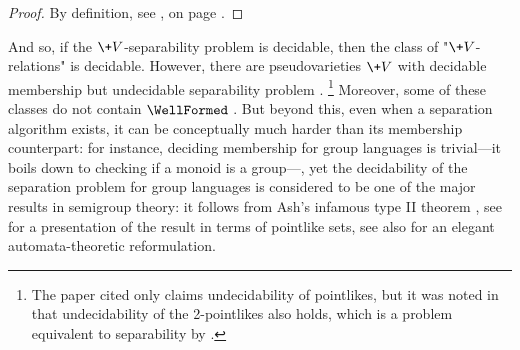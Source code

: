 \begin{proof}
	By definition, see , on page \pageref{fig:projection}.
\end{proof}

And so, if the $\+V$-separability problem is decidable, then the class of "$\+V$-relations"
is decidable. However, there are pseudovarieties $\+V$ with decidable membership but 
undecidable separability problem \cite[Corollary 1.6, p.~478]{Rhode2011Pointlike}.%
\footnote{\AP\label{footnote:undecidability-separation}The paper cited only claims undecidability of pointlikes, but it was noted in \cite[\S 1, pp.~1--2]{Gool2019Pointlike} that undecidability of the 2-pointlikes also holds, which is a problem 
equivalent to separability by \cite[Proposition 3.4, p.~6]{Almeida1999Algorithmic}.}
Moreover, some of these classes do not contain $\WellFormed$ \cite[Corollary 1.7, p.~478]{Rhode2011Pointlike}. But beyond 
this, even when a separation algorithm exists, it can be conceptually much harder than its
membership counterpart: for instance, deciding membership for group languages is trivial---it boils down to checking if a monoid is a group---, yet the decidability of the 
separation problem for group languages is considered to be one of the major results in semigroup theory:
it follows from Ash's infamous type II theorem \cite[Theorem 2.1, p.~129]{Ash1991Inevitable}, see \cite[Theorem 1.1, p.~3]{Henckell1991Ash} for a presentation of the result in terms of pointlike sets, see also \cite[\S III, Theorem 8, p.~5]{PlaceZeitoun2023Group} for an elegant automata-theoretic reformulation.

